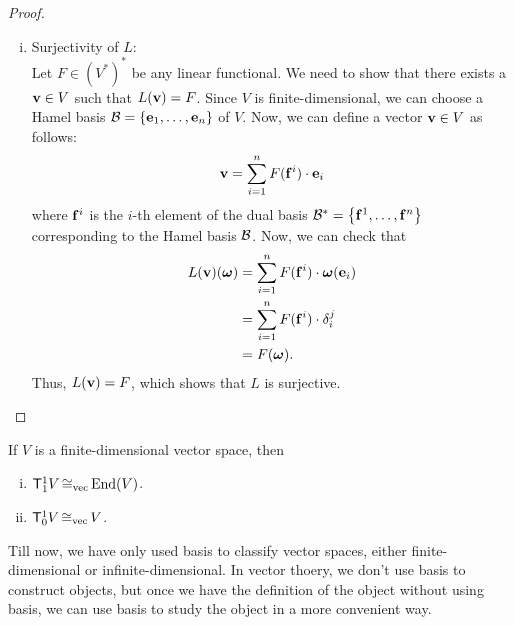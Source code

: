 \begin{proof}
\begin{enumerate}[(i)]
        \item \textsf{Surjectivity of \(L\)}:\\
              Let \(F \in (V^*)^*\) be any linear functional. We need to show that there exists a \(\vb{v} \in V\) such that \(L(\vb{v}) = F\). Since \(V\) is finite-dimensional, we can choose a Hamel basis \(\mathcal B = \qty{\vb{e}_1, \ldots, \vb{e}_n}\) of \(V\). Now, we can define a vector \(\vb{v} \in V\) as follows:
              \begin{equation}
                  \vb{v} = \sum_{i=1}^{n} F(\vb{f}^i) \cdot \vb{e}_i
              \end{equation}
              where \(\vb{f}^i\) is the \(i\)-th element of the dual basis \(\mathcal B^* = \qty{\vb{f}^1, \ldots, \vb{f}^n}\) corresponding to the Hamel basis \(\mathcal B\). Now, we can check that
              \begin{align*}
                  L(\vb{v})(\vb*{\omega}) & = \sum_{i=1}^{n} F(\vb{f}^i) \cdot \vb*{\omega}(\vb{e}_i) \\
                                          & = \sum_{i=1}^{n} F(\vb{f}^i) \cdot \delta_i^j             \\
                                          & = F(\vb*{\omega}).
              \end{align*}
              Thus, \(L(\vb{v}) = F\), which shows that \(L\) is surjective.
    \end{enumerate}
\end{proof}
\begin{corollary}
    If \(V\) is a finite-dimensional vector space, then
    \begin{enumerate}[(i)]
        \item \(\mathsf{T}^1_1 V \operatorname{\cong_{\text{vec}}} \operatorname{End}(V)\).
        \item \(\mathsf{T}^1_0 V \operatorname{\cong_{\text{vec}}} V\).
    \end{enumerate}
\end{corollary}
Till now, we have only used basis to classify vector spaces, either finite-dimensional or infinite-dimensional. In vector thoery, we don't use basis to construct objects, but once we have the definition of the object without using basis, we can use basis to study the object in a more convenient way.

